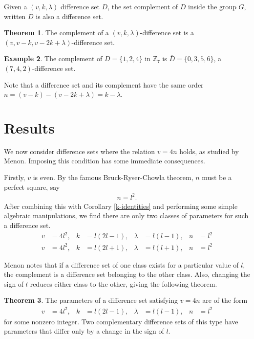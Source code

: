 \documentclass[12pt,a4paper]{article}
\theoremstyle{definition}
\newtheorem{theorem}{Theorem}[section]
\newtheorem{example}[theorem]{Example}
\begin{document}
Given a $(v, k, \lambda)$ difference set $D$, the set complement of $D$ inside the group $G$, written $\overline{D}$ is also a difference set.

\begin{theorem}
The complement of a $(v, k, \lambda)$-difference set is a $(v, v-k, v-2k+\lambda)$-difference set.
\end{theorem}

\begin{example}
The complement of $D = \{1, 2, 4\}$ in $\mathbb{Z}_7$ is $\overline{D} = \{0, 3, 5, 6\}$, a $(7, 4, 2)$-difference set.
\end{example}

Note that a difference set and its complement have the same order $n = (v-k) - (v-2k+\lambda) = k-\lambda$.

\section{Results}

We now consider difference sets where the relation $v = 4n$ holds, as studied by Menon. Imposing this condition has some immediate consequences.

Firstly, $v$ is even. By the famous Bruck-Ryser-Chowla theorem\cite{bruck1949nonexistence}, $n$ must be a perfect square, say
\begin{align*}
n = l^2.
\end{align*}
After combining this with Corollary \ref{k-identities} and performing some simple algebraic manipulations, we find there are only two classes of parameters for such a difference set.
\begin{align*}
v &= 4l^2, &k &= l(2l - 1), &\lambda &= l(l - 1), &n &= l^2 \\
v &= 4l^2, &k &= l(2l + 1), &\lambda &= l(l + 1), &n &= l^2
\end{align*}

Menon notes that if a difference set of one class exists for a particular value of $l$, the complement is a difference set belonging to the other class. Also, changing the sign of $l$ reduces either class to the other, giving the following theorem.

\begin{theorem}
The parameters of a difference set satisfying $v = 4n$ are of the form
\begin{align*}
v &= 4l^2, &k &= l(2l - 1), &\lambda &= l(l - 1), &n &= l^2
\end{align*}
for some nonzero integer. Two complementary difference sets of this type have parameters that differ only by a change in the sign of $l$.
\end{theorem}
\end{document}
